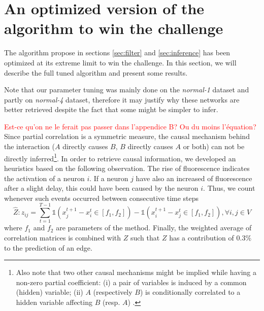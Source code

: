 \documentclass[wcp]{jmlr}
\begin{document}
\newpage
\clearpage

\appendix


\section{An optimized version of the algorithm to win the challenge}
\label{app:optimized}


The algorithm propose in sections \ref{sec:filter} and \ref{sec:inference} has been optimized at its extreme limit to win the challenge. In this section, we will describe the full tuned algorithm and present some results.

Note that our parameter tuning was mainly
done on the \textit{normal-1} dataset and partly on \textit{normal-4} dataset,
therefore it may justify why these networks are better retrieved despite the
fact that some might be simpler to infer.

\textcolor{red}{Est-ce qu'on ne le ferait pas passer dans l'appendice B? Ou du moins l'équation?}
Since partial correlation is a symmetric measure, the causal mechanism behind the
interaction ($A$ directly causes $B$, $B$ directly causes $A$ or both) can not
be directly inferred\footnote{Also note that two other causal mechanisms might be
implied while having a non-zero partial coefficient: (i) a pair of variables
is induced by a common (hidden) variable; (ii) $A$ (respectively $B$) is
conditionally correlated to a hidden variable affecting $B$ (resp. $A$)
\citep{de2004discovery}.}.
In order to retrieve causal information, we developed an
heuristics based on the following observation. The rise of fluorescence
indicates the activation of a neuron $i$. If a neuron $j$ have also
an increased of fluorescence after a slight delay, this could have been
caused by the neuron $i$. Thus, we count whenever
such events occurred between consecutive time steps
\[
\hat{Z}: z_{ij} = \sum_{t=1}^{T - 1}
    \mathbb{1}(x_j^{t+1} - x_i^t \in \left[f_1, f_2 \right]) -
    \mathbb{1}(x_i^{t+1} - x_j^t \in \left[f_1, f_2 \right]), \forall i, j \in V
\]
where $f_1$ and $f_2$ are parameters of the method.
Finally, the weighted average of correlation matrices is combined with $Z$ such
that $Z$ has a contribution of $0.3\%$ to the prediction of an edge.

\end{document}
